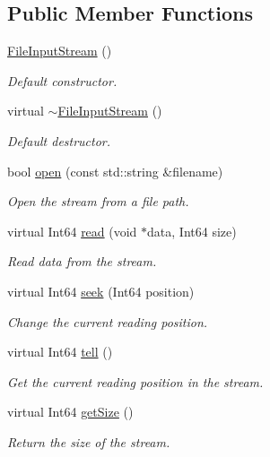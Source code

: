 \subsection*{Public Member Functions}
\begin{DoxyCompactItemize}
\item 
\mbox{\label{classsf_1_1_file_input_stream_a9a321e273f41ff7f187899061fcae9be}} 
\hyperlink{classsf_1_1_file_input_stream_a9a321e273f41ff7f187899061fcae9be}{File\+Input\+Stream} ()
\begin{DoxyCompactList}\small\item\em Default constructor. \end{DoxyCompactList}\item 
\mbox{\label{classsf_1_1_file_input_stream_ad49ae2025ff2183f80067943a7d0276d}} 
virtual \hyperlink{classsf_1_1_file_input_stream_ad49ae2025ff2183f80067943a7d0276d}{$\sim$\+File\+Input\+Stream} ()
\begin{DoxyCompactList}\small\item\em Default destructor. \end{DoxyCompactList}\item 
bool \hyperlink{classsf_1_1_file_input_stream_a87a95dc3a71746097a99c86ee58bb353}{open} (const std\+::string \&filename)
\begin{DoxyCompactList}\small\item\em Open the stream from a file path. \end{DoxyCompactList}\item 
virtual Int64 \hyperlink{classsf_1_1_file_input_stream_ad1e94c4152429f485db224c44ee1eb50}{read} (void $\ast$data, Int64 size)
\begin{DoxyCompactList}\small\item\em Read data from the stream. \end{DoxyCompactList}\item 
virtual Int64 \hyperlink{classsf_1_1_file_input_stream_abdaf5700d4e1de07568e7829106b4eb9}{seek} (Int64 position)
\begin{DoxyCompactList}\small\item\em Change the current reading position. \end{DoxyCompactList}\item 
virtual Int64 \hyperlink{classsf_1_1_file_input_stream_a768c5fdb3be79e2d71d1bce911f8741c}{tell} ()
\begin{DoxyCompactList}\small\item\em Get the current reading position in the stream. \end{DoxyCompactList}\item 
virtual Int64 \hyperlink{classsf_1_1_file_input_stream_aabdcaa315e088e008eeb9711ecc796e8}{get\+Size} ()
\begin{DoxyCompactList}\small\item\em Return the size of the stream. \end{DoxyCompactList}\end{DoxyCompactItemize}


